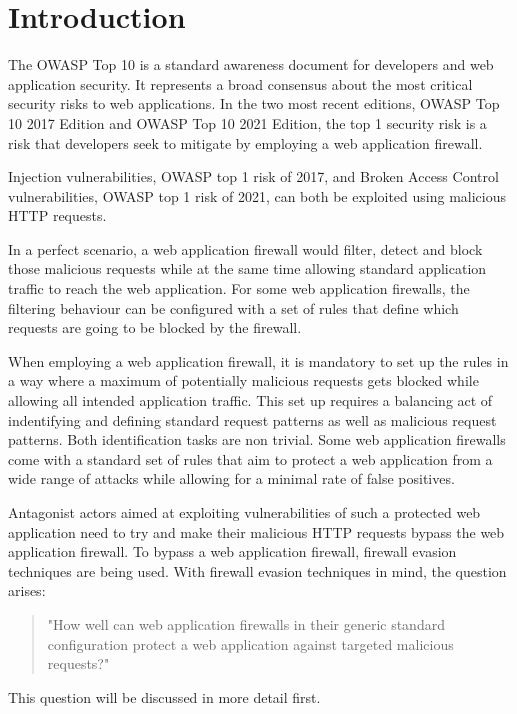 \section{Introduction}
The OWASP Top 10 is a standard awareness document for developers and web application security. It represents a broad consensus about the most critical security risks to web applications.
In the two most recent editions, OWASP Top 10 2017 Edition and OWASP Top 10 2021 Edition, the top 1 security risk is a risk that developers seek to mitigate by employing a web application firewall. \cite{OWASP/Top10,OWASP/Risks2017,OWASP/Risks2021}

Injection vulnerabilities, OWASP top 1 risk of 2017, and Broken Access Control vulnerabilities, OWASP top 1 risk of 2021, can both be exploited using malicious HTTP requests. \cite{OWASP/Injection,OWASP/BrokenAccessControl}

In a perfect scenario, a web application firewall would filter, detect and block those malicious requests while at the same time allowing standard application traffic to reach the web application. 
For some web application firewalls, the filtering behaviour can be configured with a set of rules that define which requests are going to be blocked by the firewall. \cite{OWASP/CRS,wargio/naxsiRules,Cisco/SnortRulesDocs}


When employing a web application firewall, it is mandatory to set up the rules in a way where a maximum of potentially malicious requests gets blocked while allowing all intended application traffic. This set up requires a balancing act of indentifying and defining standard request patterns as well as malicious request patterns. Both identification tasks are non trivial. Some web application firewalls come with a standard set of rules that aim to protect a web application from a wide range of attacks while allowing for a minimal rate of false positives. \cite{OWASP/CRS,wargio/naxsiRules,Cisco/SnortRulesDownload}

Antagonist actors aimed at exploiting vulnerabilities of such a protected web application need to try and make their malicious HTTP requests bypass the web application firewall. To bypass a web application firewall, firewall evasion techniques are being used. \cite{HackTricks/WAFBypass} With firewall evasion techniques in mind, the question arises: 
\begin{quote} "How well can web application firewalls in their generic standard configuration protect a web application against targeted malicious requests?" 
\end{quote}
This question will be discussed in more detail first.
